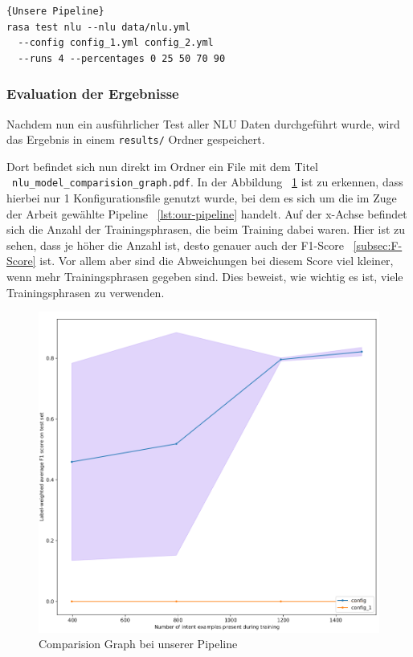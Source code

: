 \begin{lstlisting}[label={lst:comparing-pipelines-custom},caption={Unsere Pipeline}]{Unsere Pipeline}
rasa test nlu --nlu data/nlu.yml
  --config config_1.yml config_2.yml
  --runs 4 --percentages 0 25 50 70 90
\end{lstlisting}

\subsubsection{Evaluation der Ergebnisse}\label{subsubsec:evaluation-results}

Nachdem nun ein ausführlicher Test aller NLU Daten durchgeführt wurde, wird das Ergebnis in einem \texttt{results/} Ordner gespeichert.\cite{interpretingTheOutput}

Dort befindet sich nun direkt im Ordner ein File mit dem Titel ~\texttt{nlu\_model\_comparision\_graph.pdf}.
In der Abbildung ~\ref{fig:comparision_graph} ist zu erkennen, dass hierbei nur 1 Konfigurationsfile genutzt wurde, bei dem es sich um die im Zuge der Arbeit gewählte Pipeline ~\ref{lst:our-pipeline} handelt.
Auf der x-Achse befindet sich die Anzahl der Trainingsphrasen, die beim Training dabei waren.
Hier ist zu sehen, dass je höher die Anzahl ist, desto genauer auch der F1-Score ~\ref{subsec:F-Score} ist.
Vor allem aber sind die Abweichungen bei diesem Score viel kleiner, wenn mehr Trainingsphrasen gegeben sind.
Dies beweist, wie wichtig es ist, viele Trainingsphrasen zu verwenden.

\begin{figure}[hbt!]
    \centering
    \includegraphics[scale=0.4]{pics/comparision_graph}
    \caption{Comparision Graph bei unserer Pipeline}
    \label{fig:comparision_graph}
\end{figure}

